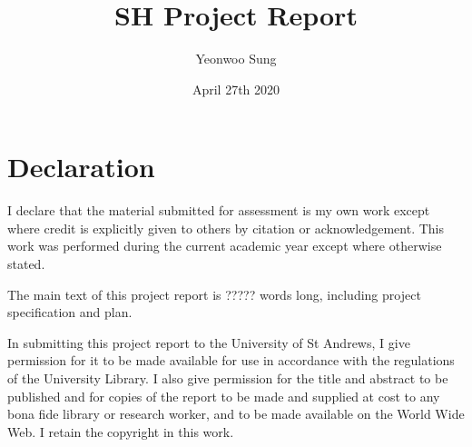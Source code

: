 \documentclass{article}
\title{SH Project Report}
\author{Yeonwoo Sung}
\date{April 27th 2020}
\begin{document}
\maketitle
{}

\newpage

\section*{Declaration}

I declare that the material submitted for assessment is my own work except where credit is explicitly given to others by citation or acknowledgement. 
This work was performed during the current academic year except where otherwise stated.

The main text of this project report is ????? words long, including project specification and plan.

In submitting this project report to the University of St Andrews, I give permission for it to be made 
available for use in accordance with the regulations of the University Library. I also give permission for 
the title and abstract to be published and for copies of the report to be made and supplied at cost to any bona fide 
library or research worker, and to be made available on the World Wide Web. I retain the copyright in this work.
\end{document}
